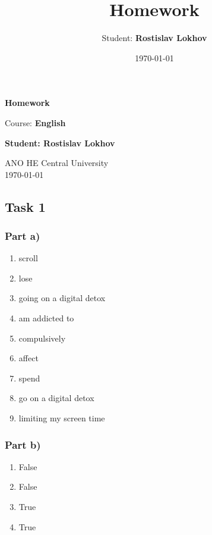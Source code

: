 \documentclass[a4paper,12pt,english]{article}
\title{Homework}
\author{Student: \textbf{Rostislav Lokhov}}
\date{\today}
\begin{document}
\begin{titlepage}
    \centering
    \vspace*{1cm}

    \Huge
    \textbf{Homework}

    \vspace{0.5cm}
    \LARGE
    Course: \textbf{English}

    \vspace{1.5cm}

    \textbf{Student: Rostislav Lokhov}

    \vfill

    \Large
    ANO HE Central University\\
    \vspace{0.3cm}
    \today

\end{titlepage}


\subsection{Task 1}

\subsubsection*{Part a)}
\begin{enumerate}
    \item scroll
    \item lose
    \item going on a digital detox
    \item am addicted to
    \item compulsively
    \item affect
    \item spend
    \item go on a digital detox
    \item limiting my screen time
\end{enumerate}

\subsubsection*{Part b)}
\begin{enumerate}
    \item False
    \item False
    \item True
    \item True
\end{enumerate}
\end{document}
